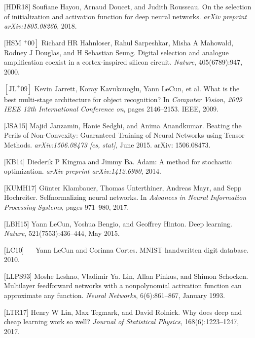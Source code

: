 \documentclass[10pt]{article}
\begin{document}
[HDR18] Soufiane Hayou, Arnaud Doucet, and Judith Rousseau. On the selection of
initialization and activation function for deep neural networks. \emph{arXiv preprint
arXiv:1805.08266}, 2018.
\newline

[HSM $\left.{ }^{+} 00\right]$ Richard HR Hahnloser, Rahul Sarpeshkar, Misha A Mahowald, Rodney J Douglas,
and H Sebastian Seung. Digital selection and analogue amplification coexist in a
cortex-inspired silicon circuit. \emph{Nature}, 405(6789):947, 2000.
\newline

$\left[\mathrm{JL}^{+} 09\right]$ Kevin Jarrett, Koray Kavukcuoglu, Yann LeCun, et al. What is the best multi-stage
architecture for object recognition? In \emph{Computer Vision, 2009 IEEE 12th International
Conference on}, pages 2146–2153. IEEE, 2009.
\newline

[JSA15] Majid Janzamin, Hanie Sedghi, and Anima Anandkumar. Beating the Perils of
Non-Convexity: Guaranteed Training of Neural Networks using Tensor Methods.
\emph{arXiv:1506.08473 [cs, stat]}, June 2015. arXiv: 1506.08473.
\newline

[KB14] Diederik P Kingma and Jimmy Ba. Adam: A method for stochastic optimization.
\emph{arXiv preprint arXiv:1412.6980}, 2014.
\newline

[KUMH17] Günter Klambauer, Thomas Unterthiner, Andreas Mayr, and Sepp Hochreiter. Selfnormalizing neural networks. In \emph{Advances in Neural Information Processing Systems},
pages 971–980, 2017.
\newline

[LBH15] Yann LeCun, Yoshua Bengio, and Geoffrey Hinton. Deep learning. \emph{Nature},
521(7553):436–444, May 2015.
\newline

[LC10] $\quad$ Yann LeCun and Corinna Cortes. MNIST handwritten digit database. 2010.
\newline

[LLPS93] Moshe Leshno, Vladimir Ya. Lin, Allan Pinkus, and Shimon Schocken. Multilayer
feedforward networks with a nonpolynomial activation function can approximate
any function. \emph{Neural Networks}, 6(6):861–867, January 1993.
\newline

[LTR17] Henry W Lin, Max Tegmark, and David Rolnick. Why does deep and cheap learning work so well? \emph{Journal of Statistical Physics}, 168(6):1223–1247, 2017.
\newline
\end{document}
